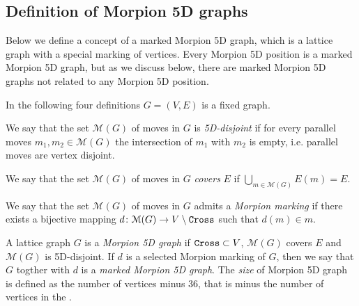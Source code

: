 
\subsection{Definition of Morpion 5D graphs}

Below we define a concept of a marked Morpion 5D graph, which is a lattice graph with a special marking of vertices. Every Morpion 5D position is a marked Morpion 5D graph, but as we discuss below, there are marked Morpion 5D graphs not related to any Morpion 5D position.

In the following 
four definitions  $G = (V, E)$ is a fixed graph. 

\begin{definition} 
We say that the set $\mathcal{M}(G)$ of moves in $G$ is \emph{5D-disjoint}
if for every parallel moves $m_1, m_2 \in \mathcal{M}(G)$ the intersection of $m_1$ with $m_2$ is empty, i.e. parallel moves are vertex disjoint.
\end{definition}

\begin{definition} 
We say that the set $\mathcal{M}(G)$ of moves in $G$ \emph{covers} $E$ if 
  $\bigcup_{m \in \mathcal{M}(G)} E(m) = E$.
\end{definition}

\begin{definition}
  We say that the set $\mathcal{M}(G)$ of moves in $G$ admits a \emph{Morpion marking} if
     there exists a bijective mapping $d \colon \mathcal{M}(G) \to V \setminus \texttt{Cross}$ such that $d(m) \in m$.
\end{definition}

\begin{definition}
  A lattice graph $G$ is a \emph{Morpion 5D graph} if $\texttt{Cross} \subset V$,
    $\mathcal{M}(G)$ covers $E$ and $\mathcal{M}(G)$ is 5D-disjoint.
  If $d$ is a selected Morpion marking of $G$, then we say that $G$ togther with $d$ is 
    a \emph{marked Morpion 5D graph}.
  The \emph{size} of Morpion 5D graph  is defined as the number of vertices minus $36$, that is minus the number of vertices in the \Cross.
 \end{definition}


